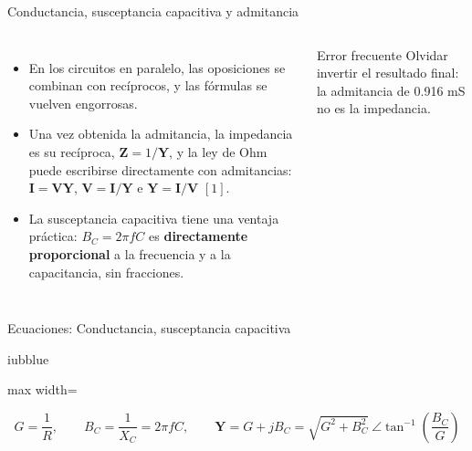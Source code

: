 \documentclass[aspectratio=169,11pt,xcolor={table}]{beamer}
\begin{document}
\begin{frame}{Conductancia, susceptancia capacitiva y admitancia}
\begin{columns}[c,onlytextwidth]
\small
\begin{itemize}\setlength{\itemsep}{4pt}
  \item En los circuitos en paralelo, las oposiciones se combinan con recíprocos, y las fórmulas se vuelven engorrosas.
  \item Una vez obtenida la admitancia, la impedancia es su recíproca, $\mathbf{Z} = 1/\mathbf{Y}$, y la ley de Ohm puede escribirse directamente con admitancias: $\mathbf{I} = \mathbf{V}\mathbf{Y}$, $\mathbf{V} = \mathbf{I}/\mathbf{Y}$ e $\mathbf{Y} = \mathbf{I}/\mathbf{V}$ $[1]$.
  \item La susceptancia capacitiva tiene una ventaja práctica: $B_C = 2\pi f C$ es \textbf{directamente proporcional} a la frecuencia y a la capacitancia, sin fracciones.
\end{itemize}
\begin{cardO}{Error frecuente}
\footnotesize Olvidar invertir el resultado final: la admitancia de 0.916 mS no es la impedancia.
\end{cardO}
\end{columns}
\end{frame}

\begin{frame}{Ecuaciones: Conductancia, susceptancia capacitiva}
\begin{cajaplana}{iubblue}
\centering
\begin{adjustbox}{max width=\linewidth}
\begin{minipage}{1.33\linewidth}
{\large
\begin{equation*}
  G = \frac{1}{R}, \qquad B_C = \frac{1}{X_C} = 2\pi f C, \qquad \mathbf{Y} = G + jB_C = \sqrt{G^{2} + B_C^{2}}\ \angle \tan^{-1}\!\left(\frac{B_C}{G}\right)
\end{equation*}
}
\end{minipage}
\end{adjustbox}
\end{cajaplana}
\end{frame}
\end{document}
